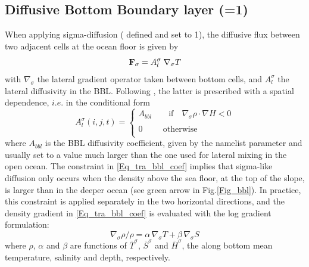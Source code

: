 \subsection{Diffusive Bottom Boundary layer (=1)}
\label{TRA_bbl_diff}

When applying sigma-diffusion ( defined and  set to 1), 
the diffusive flux between two adjacent cells at the ocean floor is given by 
\begin{equation} \label{Eq_tra_bbl_diff}
{\rm {\bf F}}_\sigma=A_l^\sigma \; \nabla_\sigma T
\end{equation} 
with $\nabla_\sigma$ the lateral gradient operator taken between bottom cells, 
and  $A_l^\sigma$ the lateral diffusivity in the BBL. Following \citet{Beckmann_Doscher1997}, 
the latter is prescribed with a spatial dependence, $i.e.$ in the conditional form
\begin{equation} \label{Eq_tra_bbl_coef}
A_l^\sigma (i,j,t)=\left\{ {\begin{array}{l}
 A_{bbl}  \quad \quad   \mbox{if}  \quad   \nabla_\sigma \rho  \cdot  \nabla H<0 \\ 
 \\
 0\quad \quad \;\,\mbox{otherwise} \\ 
 \end{array}} \right.
\end{equation} 
where $A_{bbl}$ is the BBL diffusivity coefficient, given by the namelist 
parameter  and usually set to a value much larger 
than the one used for lateral mixing in the open ocean. The constraint in \eqref{Eq_tra_bbl_coef} 
implies that sigma-like diffusion only occurs when the density above the sea floor, at the top of 
the slope, is larger than in the deeper ocean (see green arrow in Fig.\ref{Fig_bbl}). 
In practice, this constraint is applied separately in the two horizontal directions, 
and the density gradient in \eqref{Eq_tra_bbl_coef} is evaluated with the log gradient formulation: 
\begin{equation} \label{Eq_tra_bbl_Drho}
	\nabla_\sigma \rho / \rho = \alpha \,\nabla_\sigma T + \beta   \,\nabla_\sigma S
\end{equation} 
where $\rho$, $\alpha$ and $\beta$ are functions of $\overline{T}^\sigma$, 
$\overline{S}^\sigma$ and $\overline{H}^\sigma$, the along bottom mean temperature, 
salinity and depth, respectively.

